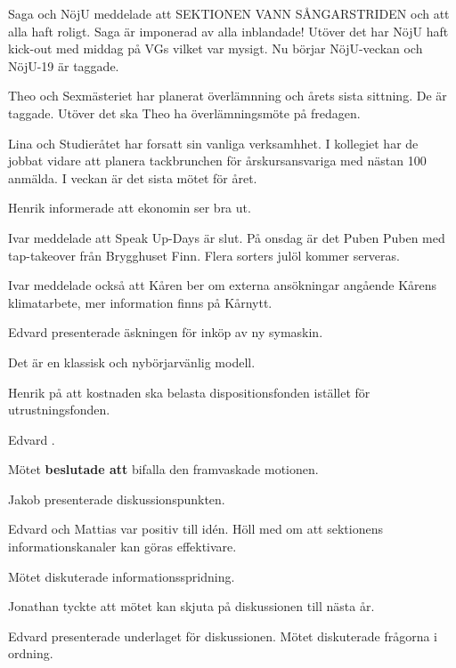 \documentclass[10pt]{article}
\begin{document}
\begin{paragrafer}
\begin{paragrafer}
Saga och NöjU meddelade att SEKTIONEN VANN SÅNGARSTRIDEN och att alla haft roligt. Saga är imponerad av alla inblandade! Utöver det har NöjU haft kick-out med middag på VGs vilket var mysigt. Nu börjar NöjU-veckan och NöjU-19 är taggade. 

Theo och Sexmästeriet har planerat överlämnning och årets sista sittning. De är taggade. Utöver det ska Theo ha överlämningsmöte på fredagen. 

Lina och Studieråtet har forsatt sin vanliga verksamhhet. I kollegiet har de jobbat vidare att planera tackbrunchen för årskursansvariga med nästan 100 anmälda. I veckan är det sista mötet för året. 




Henrik informerade att ekonomin ser bra ut.



Ivar meddelade att Speak Up-Days är slut. På onsdag är det Puben Puben med tap-takeover från Brygghuset Finn. Flera sorters julöl kommer serveras. 

Ivar meddelade också att Kåren ber om externa ansökningar angående Kårens klimatarbete, mer information finns på Kårnytt.


\end{paragrafer}

Edvard presenterade äskningen för inköp av ny symaskin.

Det är en klassisk och nybörjarvänlig modell. 

Henrik \ypa på att kostnaden ska belasta dispositionsfonden istället för utrustningsfonden.

Edvard \js. 

Mötet \textbf{beslutade att} bifalla den framvaskade motionen. 

Jakob presenterade diskussionspunkten. 

Edvard och Mattias var positiv till idén. Höll med om att sektionens informationskanaler kan göras effektivare.

Mötet diskuterade informationsspridning. 

Jonathan tyckte att mötet kan skjuta på diskussionen till nästa år. 


Edvard presenterade underlaget för diskussionen. Mötet diskuterade frågorna i ordning. 


\end{paragrafer}
\end{document}
